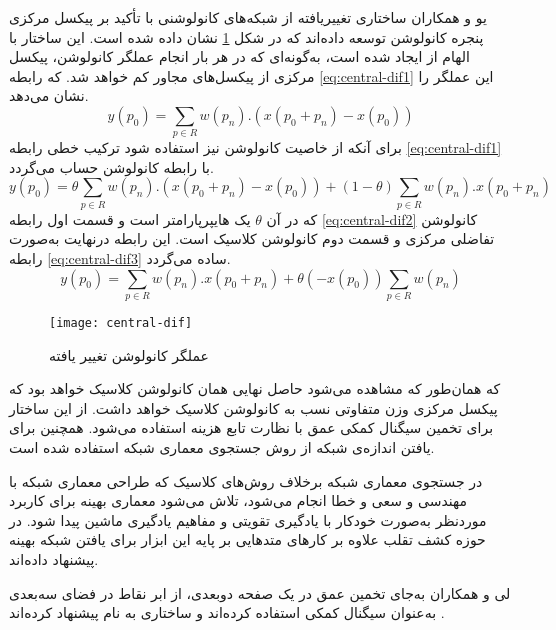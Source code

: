 یو و همکاران
\cite{yu2020searching}
ساختاری تغییر‌یافته از شبکه‌های کانولوشنی با تأکید بر پیکسل مرکزی پنجره کانولوشن توسعه داده‌اند که در شکل
\ref{fig:central-dif}
نشان داده شده است.
این ساختار با الهام از  ایجاد شده است، به‌گونه‌ای که در هر بار انجام عملگر کانولوشن، پیکسل مرکزی از پیکسل‌های مجاور کم خواهد شد. که رابطه
\ref{eq:central-dif1}
این عملگر را نشان می‌دهد.
\begin{equation}\label{eq:central-dif1}
	y(p_0) = \sum_{p \in R} w(p_n).(x(p_0+p_n)-x(p_0)) 
\end{equation}
برای آنکه از خاصیت کانولوشن نیز استفاده شود ترکیب خطی رابطه
\ref{eq:central-dif1}
با رابطه کانولوشن حساب می‌گردد.
\begin{equation}\label{eq:central-dif2}
	y(p_0) = \theta\sum_{p \in R} w(p_n).(x(p_0+p_n)-x(p_0)) +
	(1-\theta)\sum_{p \in R}w(p_n).x(p_0+p_n)
\end{equation}
که در آن
$\theta$
یک هایپر‌پارامتر است و قسمت اول رابطه
\ref{eq:central-dif2}
کانولوشن تفاضلی مرکزی و قسمت دوم کانولوشن کلاسیک است. این رابطه در‌نهایت به‌صورت رابطه
\ref{eq:central-dif3}
ساده می‌گردد.
\begin{equation}\label{eq:central-dif3}
	y(p_0) = \sum_{p \in R} {w(p_n).x(p_0+p_n)} +
	\theta(-x(p_0))\sum_{p \in R}{w(p_n)}
\end{equation}
\begin{figure}[h]
	\centerline{\texttt{[image: central-dif]}}
	\caption{عملگر کانولوشن تغییر یافته \cite{yu2020searching} }
	\label{fig:central-dif}
\end{figure}

که همان‌طور که مشاهده می‌شود حاصل نهایی همان کانولوشن کلاسیک خواهد بود که پیکسل مرکزی وزن متفاوتی نسب به کانولوشن کلاسیک خواهد داشت. از این ساختار برای تخمین سیگنال کمکی عمق با نظارت تابع هزینه   استفاده می‌شود. همچنین برای یافتن اندازه‌ی شبکه از روش جستجوی معماری شبکه 
 \cite{zoph2016neural}
استفاده شده است.

در جستجوی معماری شبکه بر‌خلاف روش‌های کلاسیک که طراحی معماری شبکه با مهندسی و سعی و خطا انجام می‌شود، تلاش می‌شود معماری بهینه برای کاربرد مورد‌نظر به‌صورت خودکار با یادگیری تقویتی و مفاهیم یادگیری ماشین پیدا شود. در حوزه کشف تقلب علاوه بر
\cite{zoph2016neural}
کارهای
\cite{yu2020fas,yu2020auto} 
متدهایی بر پایه این ابزار برای یافتن شبکه بهینه پیشنهاد داده‌اند.
 
 لی و همکاران به‌جای تخمین عمق در یک صفحه دو‌بعدی، از ابر نقاط در فضای سه‌بعدی به‌عنوان سیگنال کمکی استفاده کرده‌اند و ساختاری به نام  پیشنهاد کرده‌اند
\cite{li20203dpc}.
 

